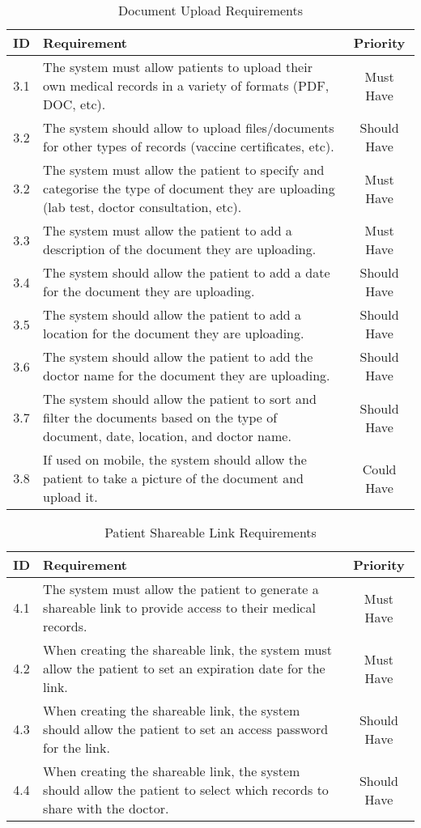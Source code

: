 \begin{table}[h!]
    \centering
    \begin{tabular}{|c|p{10cm}|c|}
    \hline
    \textbf{ID}  & \textbf{Requirement}  & \textbf{Priority} \\ \hline
    3.1  & The system must allow patients to upload their own medical records in a variety of formats (PDF, DOC, etc). & Must Have \\ \hline
    3.2 & The system should allow to upload files/documents for other types of records (vaccine certificates, etc). & Should Have \\ \hline
    3.2  & The system must allow the patient to specify and categorise the type of document they are uploading (lab test, doctor consultation, etc). & Must Have \\ \hline
    3.3 & The system must allow the patient to add a description of the document they are uploading. & Must Have \\ \hline
    3.4 & The system should allow the patient to add a date for the document they are uploading. & Should Have \\ \hline
    3.5 & The system should allow the patient to add a location for the document they are uploading. & Should Have \\ \hline
    3.6 & The system should allow the patient to add the doctor name for the document they are uploading. & Should Have \\ \hline
    3.7 & The system should allow the patient to sort and filter the documents based on the type of document, date, location, and doctor name. & Should Have \\ \hline
    3.8 & If used on mobile, the system should allow the patient to take a picture of the document and upload it. & Could Have \\ \hline
    \end{tabular}
    \caption{Document Upload Requirements}
\end{table}

\begin{table}[h!]
    \centering
    \begin{tabular}{|c|p{10cm}|c|}
    \hline
    \textbf{ID}  & \textbf{Requirement}  & \textbf{Priority} \\ \hline
    4.1  & The system must allow the patient to generate a shareable link to provide access to their medical records. & Must Have \\ \hline
    4.2  & When creating the shareable link, the system must allow the patient to set an expiration date for the link. & Must Have \\ \hline
    4.3  & When creating the shareable link, the system should allow the patient to set an access password for the link. & Should Have \\ \hline
    4.4  & When creating the shareable link, the system should allow the patient to select which records to share with the doctor. & Should Have \\ \hline
    \end{tabular}
    \caption{Patient Shareable Link Requirements}
\end{table}

